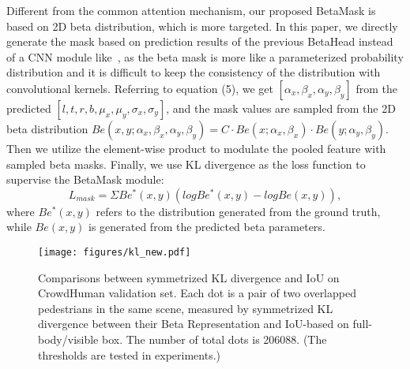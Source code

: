 \documentclass{article}
\begin{document}
Different from the common attention mechanism, our proposed BetaMask is based on 2D beta distribution, which is more targeted. In this paper, we directly generate the mask based on prediction results of the previous BetaHead instead of a CNN module like~\cite{MGAN}, as the beta mask is more like a parameterized probability distribution and it is difficult to keep the consistency of the distribution with convolutional kernels.
Referring to equation (5), we get $[\alpha_x, \beta_x, \alpha_y, \beta_y]$ from the predicted $[l, t, r, b, \mu_x, \mu_y, \sigma_x, \sigma_y]$, and the mask values are sampled from the 2D beta distribution $Be(x, y; \alpha_x, \beta_x, \alpha_y, \beta_y) = C \cdot Be(x; \alpha_x, \beta_x) \cdot Be(y; \alpha_y, \beta_y)$.
Then we utilize the element-wise product to modulate the pooled feature with sampled beta masks. Finally, we use KL divergence as the loss function to supervise the BetaMask module:
\begin{equation}
    L_{mask} = \Sigma Be^*(x, y) (log Be^*(x, y) - log Be(x, y)),
    \label{maskloss}
\end{equation}
where $Be^*(x, y)$ refers to the distribution generated from the ground truth, while $Be(x, y)$ is generated from the predicted beta parameters.

\begin{figure}
    \centering
    \texttt{[image: figures/kl\_new.pdf]}
    \caption{Comparisons between symmetrized KL divergence and IoU on CrowdHuman validation set. Each dot is a pair of two overlapped pedestrians in the same scene, measured by symmetrized KL divergence between their Beta Representation and IoU-based on full-body/visible box. The number of total dots is 206088. (The thresholds are tested in experiments.)}
    \label{kl}
\end{figure}
\end{document}
